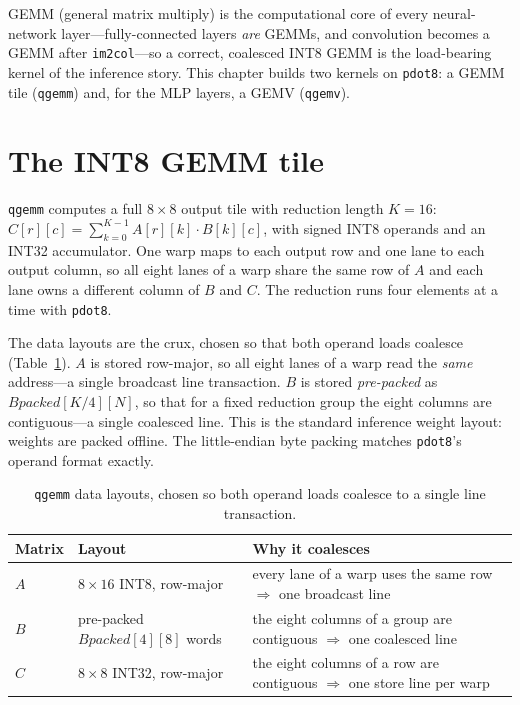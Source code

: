 \documentclass[12pt,a4paper,oneside]{report}
\newcommand{\code}[1]{\texttt{#1}}
\begin{document}
GEMM (general matrix multiply) is the computational core of every neural-network
layer---fully-connected layers \emph{are} GEMMs, and convolution becomes a GEMM
after \code{im2col}---so a correct, coalesced INT8 GEMM is the load-bearing kernel
of the inference story. This chapter builds two kernels on \code{pdot8}: a GEMM
tile (\code{qgemm}) and, for the MLP layers, a GEMV (\code{qgemv}).

\section{The INT8 GEMM tile}
\code{qgemm} computes a full $8\times 8$ output tile with reduction length $K=16$:
$C[r][c]=\sum_{k=0}^{K-1}A[r][k]\cdot B[k][c]$, with signed INT8 operands and an
INT32 accumulator. One warp maps to each output row and one lane to each output
column, so all eight lanes of a warp share the same row of $A$ and each lane owns a
different column of $B$ and $C$. The reduction runs four elements at a time with
\code{pdot8}.

The data layouts are the crux, chosen so that both operand loads coalesce
(Table~\ref{tab:layouts}). $A$ is stored row-major, so all eight lanes of a warp
read the \emph{same} address---a single broadcast line transaction. $B$ is stored
\emph{pre-packed} as $\mathit{Bpacked}[K/4][N]$, so that for a fixed reduction group
the eight columns are contiguous---a single coalesced line. This is the standard
inference weight layout: weights are packed offline. The little-endian byte packing
matches \code{pdot8}'s operand format exactly.

\begin{table}[t]
\caption{\code{qgemm} data layouts, chosen so both operand loads coalesce to a
single line transaction.}
\label{tab:layouts}
\centering
\small
\begin{tabular}{p{1.1cm}p{5.2cm}p{5.0cm}}
\toprule
Matrix & Layout & Why it coalesces\\
\midrule
$A$ & $8\times16$ INT8, row-major & every lane of a warp uses the same row
$\Rightarrow$ one broadcast line\\
$B$ & pre-packed $\mathit{Bpacked}[4][8]$ words & the eight columns of a group are
contiguous $\Rightarrow$ one coalesced line\\
$C$ & $8\times8$ INT32, row-major & the eight columns of a row are contiguous
$\Rightarrow$ one store line per warp\\
\bottomrule
\end{tabular}
\end{table}
\end{document}
